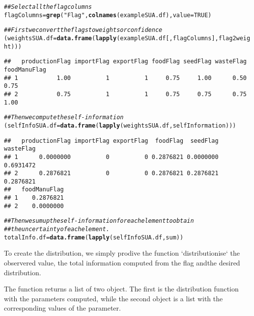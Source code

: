\documentclass[nojss]{jss}\usepackage[]{graphicx}\usepackage[]{color}
\makeatletter
\newcommand{\hlnum}[1]{\textcolor[rgb]{0.686,0.059,0.569}{#1}}%
\newcommand{\hlstr}[1]{\textcolor[rgb]{0.192,0.494,0.8}{#1}}%
\newcommand{\hlcom}[1]{\textcolor[rgb]{0.678,0.584,0.686}{\textit{#1}}}%
\newcommand{\hlstd}[1]{\textcolor[rgb]{0.345,0.345,0.345}{#1}}%
\newcommand{\hlkwb}[1]{\textcolor[rgb]{0.69,0.353,0.396}{#1}}%
\newcommand{\hlkwc}[1]{\textcolor[rgb]{0.333,0.667,0.333}{#1}}%
\newcommand{\hlkwd}[1]{\textcolor[rgb]{0.737,0.353,0.396}{\textbf{#1}}}%
\newenvironment{kframe}{%
 \def\at@end@of@kframe{}%
 \ifinner\ifhmode%
  \def\at@end@of@kframe{\end{minipage}}%
  \begin{minipage}{\columnwidth}%
 \fi\fi%
 \def\FrameCommand##1{\hskip\@totalleftmargin \hskip-\fboxsep
 \colorbox{shadecolor}{##1}\hskip-\fboxsep
     \hskip-\linewidth \hskip-\@totalleftmargin \hskip\columnwidth}%
 \MakeFramed {\advance\hsize-\width
   \@totalleftmargin\z@ \linewidth\hsize
   \@setminipage}}%
 {\par\unskip\endMakeFramed%
 \at@end@of@kframe}
\newenvironment{knitrout}{}{} %
\makeatother
\begin{document}
\begin{knitrout}
\color{fgcolor}\begin{kframe}
\begin{alltt}
\hlcom{## Select all the flag columns}
\hlstd{flagColumns} \hlkwb{=} \hlkwd{grep}\hlstd{(}\hlstr{"Flag"}\hlstd{,} \hlkwd{colnames}\hlstd{(exampleSUA.df),} \hlkwc{value} \hlstd{=} \hlnum{TRUE}\hlstd{)}

\hlcom{## First we convert the flags to weights or confidence}
\hlstd{(weightsSUA.df} \hlkwb{=} \hlkwd{data.frame}\hlstd{(}\hlkwd{lapply}\hlstd{(exampleSUA.df[, flagColumns], flag2weight)))}
\end{alltt}
\begin{verbatim}
##   productionFlag importFlag exportFlag foodFlag seedFlag wasteFlag foodManuFlag
## 1           1.00          1          1     0.75     1.00      0.50         0.75
## 2           0.75          1          1     0.75     0.75      0.75         1.00
\end{verbatim}
\begin{alltt}
\hlcom{## Then we compute the self-information}
\hlstd{(selfInfoSUA.df} \hlkwb{=} \hlkwd{data.frame}\hlstd{(}\hlkwd{lapply}\hlstd{(weightsSUA.df, selfInformation)))}
\end{alltt}
\begin{verbatim}
##   productionFlag importFlag exportFlag  foodFlag  seedFlag wasteFlag
## 1      0.0000000          0          0 0.2876821 0.0000000 0.6931472
## 2      0.2876821          0          0 0.2876821 0.2876821 0.2876821
##   foodManuFlag
## 1    0.2876821
## 2    0.0000000
\end{verbatim}
\begin{alltt}
\hlcom{## Then we sum up the self-information for each element to obtain }
\hlcom{## the uncertainty of each element.}
\hlstd{totalInfo.df} \hlkwb{=} \hlkwd{data.frame}\hlstd{(}\hlkwd{lapply}\hlstd{(selfInfoSUA.df, sum))}
\end{alltt}
\end{kframe}
\end{knitrout}


To create the distribution, we simply prodive the function
`distributionise` the observered value, the total information computed
from the flag andthe desired distribution.

The function returns a list of two object. The first is the
distribution function with the parameters computed, while the second
object is a list with the corresponding values of the parameter.
\end{document}
